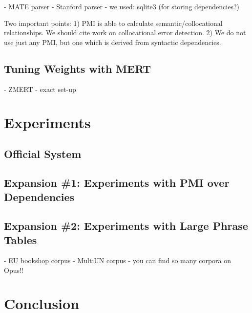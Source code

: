 \documentclass[11pt]{article}
\begin{document}
- MATE parser
- Stanford parser
- we used: sqlite3 (for storing dependencies?)

Two important points: 1) PMI is able to calculate semantic/collocational relationships.  We should cite work on collocational error detection.  2) We do not use just any PMI, but one which is derived from syntactic dependencies.

\subsection{Tuning Weights with MERT}
- ZMERT \cite{zaidan:zmert:09}
- exact set-up

\section{Experiments}

\subsection{Official System}
\cite{nltkbook}

\subsection{Expansion \#1: Experiments with PMI over Dependencies}

\subsection{Expansion \#2: Experiments with Large Phrase Tables}

- EU bookshop corpus
- MultiUN corpus
- you can find so many corpora on Opus!! \cite{tiedemann:12}

\section{Conclusion} 



\end{document}
